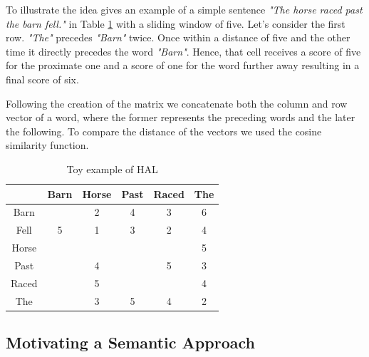  To illustrate the idea \cite{burgess98} gives an example of a simple sentence \emph {"The horse raced past the barn fell."} in Table \ref{tab:halex} with a sliding window of five. Let's consider the first row.  \emph{"The"} precedes \emph{"Barn"} twice. Once within a distance of five and the other time it directly precedes the word  \emph{"Barn"}. Hence, that cell receives a score of five for the proximate one and a score of one for the word further away resulting in a final score of six. 

Following the creation of the matrix we concatenate both the column and row vector of a word, where the former represents the preceding words and the later the following. To compare the distance of the vectors we used the cosine similarity function. 

 



\begin{table}[h]
\centering
\begin{tabular}{ c c c c c c} \toprule
  & Barn & Horse &  Past & Raced & The \\ 
  \hline
 Barn &  & 2 &  4 & 3 & 6 \\ 
 Fell & 5 & 1 &  3 & 2 & 4 \\ 
 Horse &  &  &   &  & 5 \\ 
 Past &  & 4 &   & 5 & 3 \\ 
 Raced &  & 5 &   &  & 4 \\ 
 The &  & 3 &  5 & 4 & 2 \\ 
   \bottomrule
\end{tabular}
\caption{Toy example of HAL}
\label{tab:halex}
\end{table}


\subsection{Motivating a Semantic Approach}
\label{subsec:hal}

